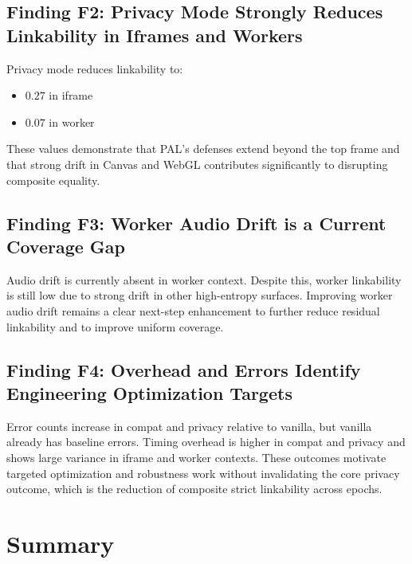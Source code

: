 \documentclass[11pt]{report}
\begin{document}
\subsection{Finding F2: Privacy Mode Strongly Reduces Linkability in Iframes and Workers}

Privacy mode reduces linkability to:
\begin{itemize}
    \item $0.27$ in iframe
    \item $0.07$ in worker
\end{itemize}

These values demonstrate that PAL’s defenses extend beyond the top frame and that strong drift in Canvas and WebGL contributes significantly to disrupting composite equality.

\subsection{Finding F3: Worker Audio Drift is a Current Coverage Gap}

Audio drift is currently absent in worker context. Despite this, worker linkability is still low due to strong drift in other high-entropy surfaces. Improving worker audio drift remains a clear next-step enhancement to further reduce residual linkability and to improve uniform coverage.

\subsection{Finding F4: Overhead and Errors Identify Engineering Optimization Targets}

Error counts increase in compat and privacy relative to vanilla, but vanilla already has baseline errors. Timing overhead is higher in compat and privacy and shows large variance in iframe and worker contexts. These outcomes motivate targeted optimization and robustness work without invalidating the core privacy outcome, which is the reduction of composite strict linkability across epochs.

\section{Summary}
\end{document}
